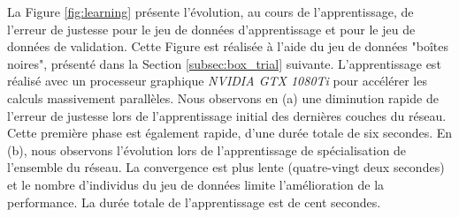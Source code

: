 La Figure \ref{fig:learning} présente l'évolution, au cours de l'apprentissage, de l'erreur de justesse pour le jeu de données d'apprentissage et pour le jeu de données de validation.
Cette Figure est réalisée à l'aide du jeu de données "boîtes noires", présenté dans la Section \ref{subsec:box_trial} suivante.
L'apprentissage est réalisé avec un processeur graphique \textit{NVIDIA GTX 1080Ti} pour accélérer les calculs massivement parallèles.
Nous observons en (a) une diminution rapide de l'erreur de justesse lors de l'apprentissage initial des dernières couches du réseau.
Cette première phase est également rapide, d'une durée totale de six secondes.
En (b), nous observons l'évolution lors de l'apprentissage de spécialisation de l'ensemble du réseau.
La convergence est plus lente (quatre-vingt deux secondes) et le nombre d'individus du jeu de données limite l'amélioration de la performance.
La durée totale de l'apprentissage est de cent secondes.

